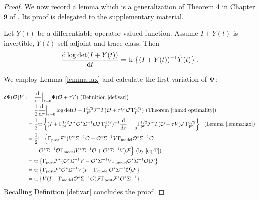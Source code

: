 \begin{proof}
  We now record a lemma which is a generalization of Theorem 4 in
  Chapter 9 of \cite{Lax07}. Its proof is delegated to the supplementary material.
  \begin{lemma}\label{lemma:lax}
    Let $Y(t)$ be a differentiable operator-valued function. Assume 
    $I+Y(t)$ is invertible, $Y(t)$ self-adjoint and trace-class. Then
    \begin{equation*}
      \frac{\text{\textup{d}} \log \det (I+Y(t))}{\text{\textup{d}} t} = \textup{tr}\left \{(I+Y(t))^{-1} \dot{Y}(t) \right \}.
    \end{equation*}
  \end{lemma}
  
  We employ Lemma \ref{lemma:lax} and calculate the first variation of
  $\Psi$:

  \begin{align*}
      \delta \Psi(\mathcal{O}) V 
      :&= \frac{\text{\textup{d}}}{\text{\textup{d}}\tau} \Big |_{\tau=0} \Psi(\mathcal{O} + \tau V) \text{ (Definition \ref{def:var})}\\
      &= \frac12 \frac{\text{\textup{d}}}{\text{\textup{d}} \tau} \Big |_{\tau=0} \log \det 
      (I + \Gamma_{\textup{pr}}^{1/2} \mathcal{F}^* T(\mathcal{O}+\tau V)\mathcal{F} \Gamma_{\textup{pr}}^{1/2} ) \text{ (Theorem \ref{thm:d optimality})} \\
      &= \frac12 \textup{tr}\left \{( I + \Gamma_{\textup{pr}}^{1/2} \mathcal{F}^* \mathcal{O}^* \Sigma^{-1}
        \mathcal{O}\mathcal{F} \Gamma_{\textup{pr}}^{1/2} )^{-1}
        \frac{\text{\textup{d}}}{\text{\textup{d}} \tau} \Big |_{\tau=0}
        \Gamma_{\textup{pr}}^{1/2} \mathcal{F}^* T(\mathcal{O}+\tau V) \mathcal{F} \Gamma_{\textup{pr}}^{1/2} \right \}\ \text{ (Lemma \ref{lemma:lax})} \\
      &= \frac12 \textup{tr}\ \Big \{ \Gamma_{\textup{post}} \mathcal{F}^* (V^* \Sigma^{-1} \mathcal{O} 
      - \mathcal{O}^*\Sigma^{-1} V\Gamma_{\textup{model}} \mathcal{O}^* \Sigma^{-1}\mathcal{O} \\
      &\ \ \ - \mathcal{O}^* \Sigma^{-1} \mathcal{O} \Gamma_{\textup{model}} V^* \Sigma^{-1}\mathcal{O} 
      + \mathcal{O}^* \Sigma^{-1} V ) \mathcal{F} \Big \}  \text{ (by \eqref{eq:T})} \\
      &= \textup{tr}\left \{\Gamma_{\textup{post}} \mathcal{F}^* ( \mathcal{O}^* \Sigma^{-1} V -
      \mathcal{O}^*\Sigma^{-1} V\Gamma_{\textup{model}} \mathcal{O}^* \Sigma^{-1}\mathcal{O} ) \mathcal{F} \right \} \\
      &= \textup{tr}\left \{\Gamma_{\textup{post}} \mathcal{F}^* \mathcal{O}^* \Sigma^{-1} V 
      ( I - \Gamma_{\textup{model}} \mathcal{O}^* \Sigma^{-1}\mathcal{O} ) \mathcal{F} \right \} \\
      &= \textup{tr}\left \{V ( I - \Gamma_{\textup{model}} \mathcal{O}^* \Sigma^{-1}\mathcal{O} )
      \mathcal{F} \Gamma_{\textup{post}} \mathcal{F}^* \mathcal{O}^* \Sigma^{-1} \right \}.
  \end{align*} 
  Recalling Definition \ref{def:var} concludes the proof.
\end{proof}

